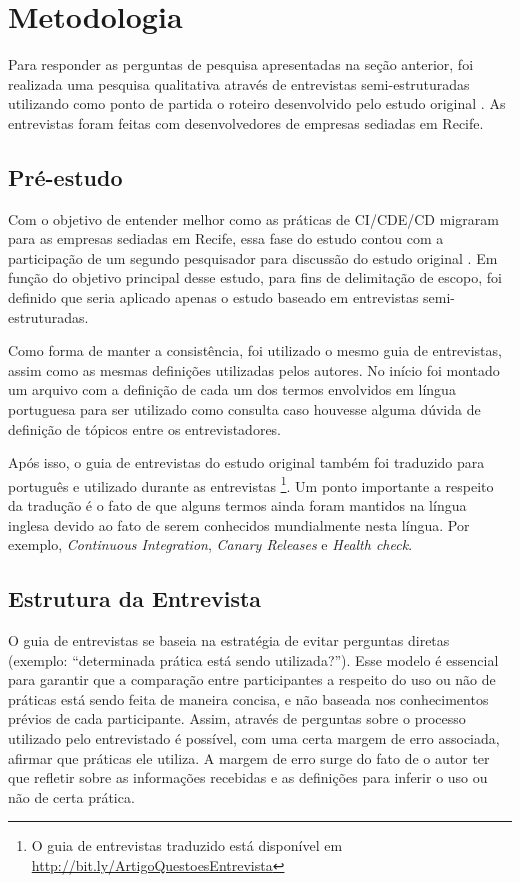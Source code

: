 
\section{Metodologia}
Para responder as perguntas de pesquisa apresentadas na seção anterior, foi realizada uma pesquisa qualitativa através de entrevistas semi-estruturadas utilizando como ponto de partida o roteiro desenvolvido pelo estudo original \cite{empiricalStudy2016}. As entrevistas foram feitas com desenvolvedores de empresas sediadas em Recife.


\subsection{Pré-estudo}

Com o objetivo de entender melhor como as práticas de CI/CDE/CD migraram para as empresas sediadas em Recife, essa fase do estudo contou com a participação de um segundo pesquisador para discussão do estudo original \cite{empiricalStudy2016}. Em função do objetivo principal desse estudo, para fins de delimitação de escopo, foi definido que seria aplicado apenas o estudo baseado em entrevistas semi-estruturadas. 

Como forma de manter a consistência, foi utilizado o mesmo guia de entrevistas, assim como as mesmas definições utilizadas pelos autores. No início foi montado um arquivo com a definição de cada um dos termos envolvidos em língua portuguesa para ser utilizado como consulta caso houvesse alguma dúvida de definição de tópicos entre os entrevistadores.

Após isso, o guia de entrevistas do estudo original também foi traduzido para português e utilizado durante as entrevistas \footnote{O guia de entrevistas traduzido está disponível em \url{http://bit.ly/ArtigoQuestoesEntrevista}}. Um ponto importante a respeito da tradução é o fato de que alguns termos ainda foram mantidos na língua inglesa devido ao fato de serem conhecidos mundialmente nesta língua. Por exemplo, \emph{Continuous Integration}, \emph{Canary Releases} e \emph{Health check}.


\subsection{Estrutura da Entrevista}

O guia de entrevistas se baseia na estratégia de evitar perguntas diretas (exemplo: “determinada prática está sendo utilizada?”). Esse modelo é essencial para garantir que a comparação entre participantes a respeito do uso ou não de práticas está sendo feita de maneira concisa, e não baseada nos conhecimentos prévios de cada participante. Assim, através de perguntas sobre o processo utilizado pelo entrevistado é possível, com uma certa margem de erro associada, afirmar que práticas ele utiliza. A margem de erro surge do fato de o autor ter que refletir sobre as informações recebidas e as definições para inferir o uso ou não de certa prática.

